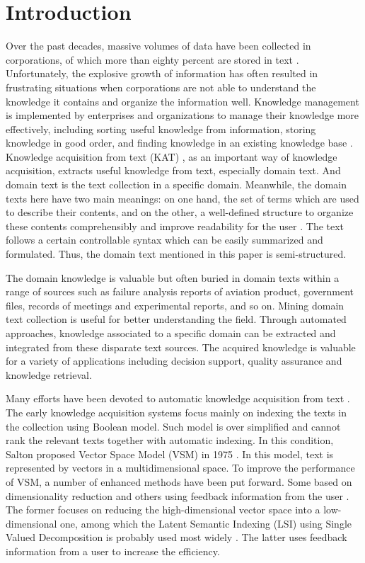 \documentclass{elsarticle}
\begin{document}
\section{Introduction}
\label{sec:introduction}

Over the past decades, massive volumes of data have been collected in
corporations, of which more than eighty percent are stored in
text \cite{Mitchell2003}. Unfortunately, the explosive growth of
information has often resulted in frustrating situations when
corporations are not able to understand the knowledge it contains 
and organize the information well. Knowledge management is
implemented by enterprises and organizations to manage their knowledge
more effectively, including sorting useful knowledge from information, storing
knowledge in good order, and finding knowledge in an existing
knowledge base \cite{turban2001dss}. Knowledge acquisition from text
(KAT) , as an important way of knowledge acquisition, 
extracts useful knowledge from
text, especially domain text. And domain text is the text collection in a specific domain. Meanwhile, the domain texts here have two
main meanings: on one hand, the set of terms which are used to
describe their contents, and on the other, a well-defined structure to
organize these contents comprehensibly and improve readability for the
user \cite{Campos2004}. The text follows a certain controllable syntax
which can be easily summarized and formulated. Thus, the domain text
mentioned in this paper is semi-structured. 

The domain knowledge is valuable but often buried in domain texts
within a range of sources such as failure analysis reports of aviation
product, government files, records of meetings and experimental
reports, and so on. Mining domain text collection is useful for better understanding
the field. Through automated approaches, knowledge
associated to a specific domain can be extracted and integrated from
these disparate text sources. The acquired knowledge is valuable for a variety of applications including decision support, quality assurance and knowledge retrieval.

Many efforts have been devoted to automatic knowledge
acquisition from text \cite{salton1975vsm,361220,215383,Tai2002,130346} . The early knowledge acquisition systems focus mainly on indexing the
texts in the collection using Boolean model. Such model is over
simplified and cannot rank the relevant texts together with automatic
indexing. In this condition, Salton proposed Vector Space Model (VSM) in 1975 \cite{salton1975vsm,361220}. In this model, text is represented by vectors in a multidimensional space. To improve the performance of VSM, a number of enhanced methods have been put forward. Some based on dimensionality reduction and others using feedback information from the user \cite{Tai2002}. The former focuses on reducing the high-dimensional vector space into a low-dimensional one, among which the Latent Semantic Indexing (LSI) using Single Valued Decomposition is probably used most widely \cite{130346}. The latter uses feedback information from a user to increase the efficiency.
\end{document}
